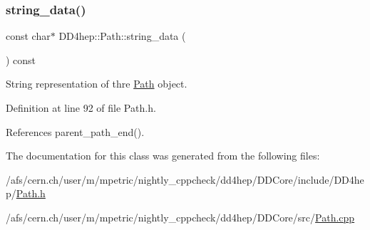 \subsubsection{\texorpdfstring{string\+\_\+data()}{string\_data()}}
{\footnotesize\ttfamily const char$\ast$ D\+D4hep\+::\+Path\+::string\+\_\+data (\begin{DoxyParamCaption}{ }\end{DoxyParamCaption}) const\hspace{0.3cm}{\ttfamily [inline]}}



String representation of thre \hyperlink{class_d_d4hep_1_1_path}{Path} object. 



Definition at line 92 of file Path.\+h.



References parent\+\_\+path\+\_\+end().



The documentation for this class was generated from the following files\+:\begin{DoxyCompactItemize}
\item 
/afs/cern.\+ch/user/m/mpetric/nightly\+\_\+cppcheck/dd4hep/\+D\+D\+Core/include/\+D\+D4hep/\hyperlink{_path_8h}{Path.\+h}\item 
/afs/cern.\+ch/user/m/mpetric/nightly\+\_\+cppcheck/dd4hep/\+D\+D\+Core/src/\hyperlink{_path_8cpp}{Path.\+cpp}\end{DoxyCompactItemize}
